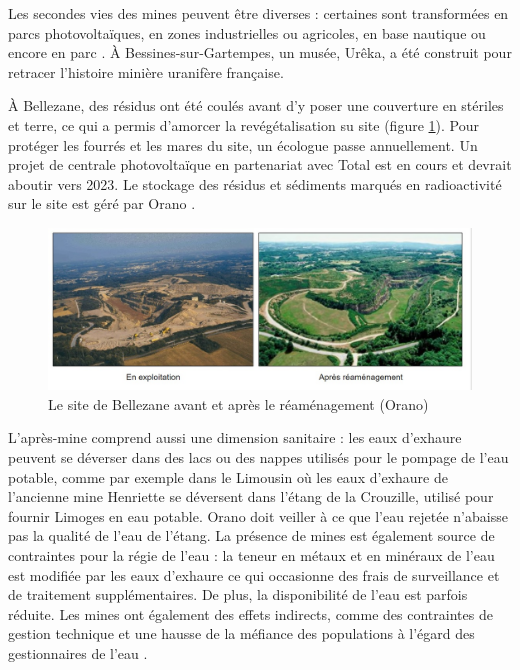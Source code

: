 \documentclass{article}
\begin{document}
Les secondes vies des mines peuvent être diverses : certaines sont transformées en parcs photovoltaïques, en zones industrielles ou agricoles, en base nautique ou encore en parc \cite{himeur_apres-mine_2020}. À Bessines-sur-Gartempes, un musée, Urêka, a été construit pour retracer l'histoire minière uranifère française.

À Bellezane, des résidus ont été coulés avant d’y poser une couverture en stériles et terre, ce qui a permis d'amorcer la revégétalisation su site (figure \ref{fig:bellezane_avant_apres}). Pour protéger les fourrés et les mares du site, un écologue passe annuellement. Un projet de centrale photovoltaïque en partenariat avec Total est en cours et devrait aboutir vers 2023. Le stockage des résidus et sédiments marqués en radioactivité sur le site est géré par Orano \cite{benesteau_site_2020}.

\begin{figure}[H]
    \centering
    \includegraphics[width=\textwidth]{I_B_2.jpg}
    \caption{Le site de Bellezane avant et après le réaménagement (Orano)}
    \label{fig:bellezane_avant_apres}
\end{figure}

L’après-mine comprend aussi une dimension sanitaire : les eaux d’exhaure peuvent se déverser dans des lacs ou des nappes utilisés pour le pompage de l’eau potable, comme par exemple dans le Limousin où les eaux d'exhaure de l'ancienne mine Henriette se déversent dans l'étang de la Crouzille, utilisé pour fournir Limoges en eau potable. Orano doit veiller à ce que l'eau rejetée n'abaisse pas la qualité de l'eau de l'étang. La présence de mines est également source de contraintes pour la régie de l’eau : la teneur en métaux et en minéraux de l’eau est modifiée par les eaux d’exhaure ce qui occasionne des frais de surveillance et de traitement supplémentaires. De plus, la disponibilité de l’eau est parfois réduite. Les mines ont également des effets indirects, comme des contraintes de gestion technique et une hausse de la méfiance des populations à l’égard des gestionnaires de l’eau \cite{vialleseche_station_2020}.
\end{document}
